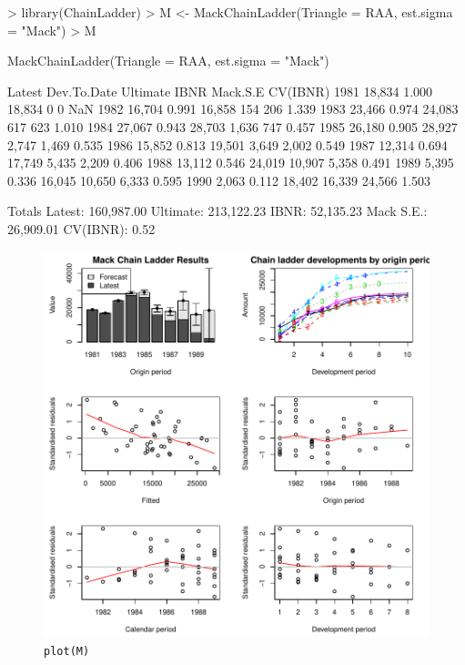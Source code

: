 \documentclass[a4paper]{article}
\begin{document}
\begin{Schunk}
\begin{Sinput}
> library(ChainLadder)
> M <- MackChainLadder(Triangle = RAA, est.sigma = "Mack")
> M
\end{Sinput}
\begin{Soutput}
MackChainLadder(Triangle = RAA, est.sigma = "Mack")

     Latest Dev.To.Date Ultimate   IBNR Mack.S.E CV(IBNR)
1981 18,834       1.000   18,834      0        0      NaN
1982 16,704       0.991   16,858    154      206    1.339
1983 23,466       0.974   24,083    617      623    1.010
1984 27,067       0.943   28,703  1,636      747    0.457
1985 26,180       0.905   28,927  2,747    1,469    0.535
1986 15,852       0.813   19,501  3,649    2,002    0.549
1987 12,314       0.694   17,749  5,435    2,209    0.406
1988 13,112       0.546   24,019 10,907    5,358    0.491
1989  5,395       0.336   16,045 10,650    6,333    0.595
1990  2,063       0.112   18,402 16,339   24,566    1.503

               Totals
Latest:    160,987.00
Ultimate:  213,122.23
IBNR:       52,135.23
Mack S.E.:  26,909.01
CV(IBNR):        0.52
\end{Soutput}
\end{Schunk}
\begin{figure}[h]
  \begin{center}
\includegraphics{ChainLadder-012}
    \caption{\texttt{plot(M)}}
  \end{center}
\end{figure}
\end{document}
